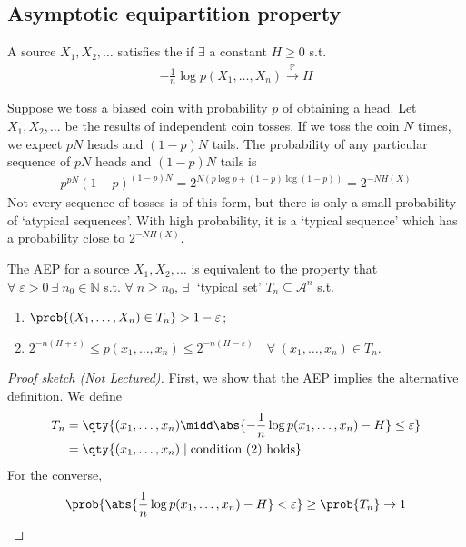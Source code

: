 \subsection{Asymptotic equipartition property}
\begin{definition}
    A source $X_1, X_2, \dots$ satisfies the  if $\exists$ a constant $H \geq 0$ s.t.
    \begin{align*}
        -\frac{1}{n} \log p(X_1, \dots, X_n) \xrightarrow{\mathbb P} H
    \end{align*}
\end{definition}

\begin{example}
    Suppose we toss a biased coin with probability $p$ of obtaining a head.
    Let $X_1, X_2, \dots$ be the results of independent coin tosses.
    If we toss the coin $N$ times, we expect $pN$ heads and $(1-p)N$ tails.
    The probability of any particular sequence of $pN$ heads and $(1-p)N$ tails is
    \begin{align*}
        p^{pN} (1-p)^{(1-p)N} = 2^{N (p \log p + (1-p) \log(1-p))} = 2^{-NH(X)}
    \end{align*}
    Not every sequence of tosses is of this form, but there is only a small probability of `atypical sequences'.
    With high probability, it is a `typical sequence' which has a probability close to $2^{-NH(X)}$.
\end{example}

\begin{lemma}
    The AEP for a source $X_1, X_2, \dots$ is equivalent to the property that $\forall \; \varepsilon > 0 \ \exists \; n_0 \in \mathbb N$ s.t. $\forall \; n \geq n_0$, $\exists \;$ `typical set' $T_n \subseteq \mathcal A^n$ s.t.
    \begin{enumerate}
        \item $\prob{(X_1, \dots, X_n) \in T_n} > 1 - \varepsilon$;
        \item $2^{-n(H+\varepsilon)} \leq p(x_1, \dots, x_n) \leq 2^{-n(H-\varepsilon)} \quad \forall \; (x_1, \dots, x_n) \in T_n$.
    \end{enumerate}
\end{lemma}

\begin{proof}[Proof sketch (Not Lectured)]
    First, we show that the AEP implies the alternative definition.
    We define
    \begin{align*}
        T_n &= \qty{(x_1, \dots, x_n) \midd \abs{-\frac{1}{n} \log p(x_1, \dots, x_n) - H} \leq \varepsilon} \\
        &= \qty{(x_1, \dots, x_n) \mid \text{condition (2) holds}}
    \end{align*}
    For the converse,
    \begin{align*}
        \prob{\abs{\frac{1}{n}\log p(x_1, \dots, x_n) - H} < \varepsilon} \geq \prob{T_n} \to 1
    \end{align*}
\end{proof}

